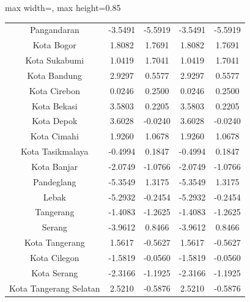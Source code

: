 \begin{table}[H]
\begin{adjustbox}{max width=\textwidth, max height=0.85\textheight}
\begin{tabular}{|c|c|c|c|c|}
Pangandaran & -3.5491 & -5.5919 & -3.5491 & -5.5919 \\
Kota Bogor & 1.8082 & 1.7691 & 1.8082 & 1.7691 \\
Kota Sukabumi & 1.0419 & 1.7041 & 1.0419 & 1.7041 \\
Kota Bandung & 2.9297 & 0.5577 & 2.9297 & 0.5577 \\
Kota Cirebon & 0.0246 & 0.2500 & 0.0246 & 0.2500 \\
Kota Bekasi & 3.5803 & 0.2205 & 3.5803 & 0.2205 \\
Kota Depok & 3.6028 & -0.0240 & 3.6028 & -0.0240 \\
Kota Cimahi & 1.9260 & 1.0678 & 1.9260 & 1.0678 \\
Kota Tasikmalaya & -0.4994 & 0.1847 & -0.4994 & 0.1847 \\
Kota Banjar & -2.0749 & -1.0766 & -2.0749 & -1.0766 \\
Pandeglang & -5.3549 & 1.3175 & -5.3549 & 1.3175 \\
Lebak & -5.2932 & -0.2454 & -5.2932 & -0.2454 \\
Tangerang & -1.4083 & -1.2625 & -1.4083 & -1.2625 \\
Serang & -3.9612 & 0.8466 & -3.9612 & 0.8466 \\
Kota Tangerang & 1.5617 & -0.5627 & 1.5617 & -0.5627 \\
Kota Cilegon & -1.5819 & -0.0560 & -1.5819 & -0.0560 \\
Kota Serang & -2.3166 & -1.1925 & -2.3166 & -1.1925 \\
Kota Tangerang Selatan & 2.5210 & -0.5876 & 2.5210 & -0.5876 \\
\hline
\end{tabular}
\end{adjustbox}
\end{table}